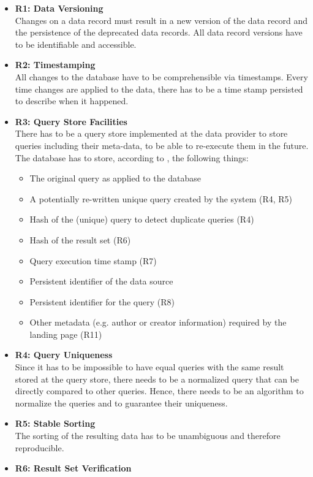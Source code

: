 \documentclass[draft,final]{vutinfth} %
\begin{document}
\begin{itemize}
	\item \textbf{R1: Data Versioning} \\
	Changes on a data record must result in a new version of the data record and the persistence of the deprecated data records. All data record versions have to be identifiable and accessible. 
	\item \textbf{R2: Timestamping} \\
	All changes to the database have to be comprehensible via timestamps. Every time changes are applied to the data, there has to be a time stamp persisted to describe when it happened. 
	\item \textbf{R3: Query Store Facilities} \\
	There has to be a query store implemented at the data provider to store queries including their meta-data, to be able to re-execute them in the future. The database has to store, according to \cite{rauber2016identification}, the following things: 
	\begin{itemize}
		\item The original query as applied to the database
		\item A potentially re-written unique query created by the system (R4, R5)
		\item Hash of the (unique) query to detect duplicate queries (R4)
		\item Hash of the result set (R6)
		\item Query execution time stamp (R7)
		\item Persistent identifier of the data source
		\item Persistent identifier for the query (R8)
		\item Other metadata (e.g. author or creator information) required by the landing page (R11)
	\end{itemize}
	\item \textbf{R4: Query Uniqueness} \\
	Since it has to be impossible to have equal queries with the same result stored at the query store, there needs to be a normalized query that can be directly compared to other queries. Hence, there needs to be an algorithm to normalize the queries and to guarantee their uniqueness.
	\item \textbf{R5: Stable Sorting} \\
	The sorting of the resulting data has to be unambiguous and therefore reproducible.
	\item \textbf{R6: Result Set Verification} \\

\end{itemize}
\end{document}

